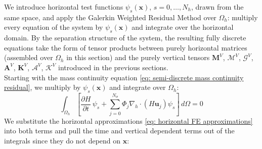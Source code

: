 \documentclass{article}
\newcommand{\Ns}{N_\sigma}
\newcommand{\uj}{\mathbf{u}_j}
\newcommand{\sumj}{\sum_{j=0}^{\Ns}}
\newcommand{\nablah}{\nabla_h}
\newcommand{\ddt}[1]{\frac{\partial #1}{\partial t}}
\newcommand{\VmM}{\mathbf{M}^V}
\newcommand{\VmA}{\mathbf{A}^V}
\newcommand{\VmK}{\mathbf{K}^V}
\newcommand{\VtM}{\boldsymbol{\mathcal{M}}^V}
\newcommand{\VtG}{\boldsymbol{\mathcal{G}}^V}
\newcommand{\VtA}{\boldsymbol{\mathcal{A}}^V}
\newcommand{\VtK}{\boldsymbol{\mathcal{K}}^V}
\newcommand{\Nh}{N_h}
\begin{document}
We introduce horizontal test functions $\psi_s(\mathbf{x})$, $s=0,\ldots,\Nh$, drawn from the same space, and apply the Galerkin Weighted Residual Method over $\Omega_h$: multiply every equation of the system by $\psi_s(\mathbf{x})$ and integrate over the horizontal domain.
By the separation structure of the system, the resulting fully discrete equations take the form of tensor products between purely horizontal matrices (assembled over $\Omega_h$ in this section) and the purely vertical tensors $\VmM$, $\VtM$, $\VtG$, $\VmA$, $\VmK$, $\VtA$, $\VtK$ introduced in the previous sections.\\
 
Starting with the mass continuity equation \eqref{eq: semi-discrete mass continuity residual}, we multiply by $\psi_s(\mathbf{x})$ and integrate over $\Omega_h$:
$$\int_{\Omega_h} \left[ \ddt{H}\, \psi_s  + \sumj \Phi_j \nablah \cdot \left( H \uj\right) \psi_s \right] \, d\Omega = 0$$
We substitute the horizontal approximations \eqref{eq: horizontal FE approximations} into both terms and pull the time and vertical dependent terms out of the integrals since they do not depend on $\mathbf{x}$:
\end{document}

